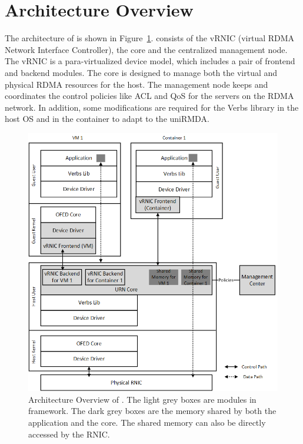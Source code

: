 \section{Architecture Overview} \label{overview}


The architecture of \sys is shown in Figure~\ref{fig:framework-overview}. \sys consists of the vRNIC (virtual RDMA Network Interface Controller), the \sys core and the centralized management node. The vRNIC is a para-virtualized device model, which includes a pair of frontend and backend modules.
The \sys core is designed to manage both the virtual and physical RDMA resources for the host.
The management node keeps and coordinates the control policies like ACL and QoS for the servers on the RDMA network.
In addition, some modifications are required for the Verbs library in the host OS and in the container to adapt to the uniRMDA.

\begin{figure}[!ht]
	\centering
	\includegraphics[width=1\linewidth]{images/framework-overview.png}
	\caption{Architecture Overview of \sys. The light grey boxes are modules in \sys framework. The dark grey boxes are the memory shared by both the application and the \sys core. The shared memory can also be directly accessed by the RNIC.}
	\label{fig:framework-overview}
\end{figure}

